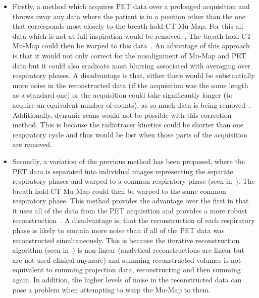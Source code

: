             \begin{itemize}
                \item Firstly, a method which acquires \gls{PET} data over a prolonged acquisition and throws away any data where the patient is in a position other than the one that corresponds most closely to the breath hold \gls{CT} \gls{Mu-Map}. For this all data which is not at full inspiration would be removed~\parencite{Liu2010, Grootjans2014}. %
                The breath hold \gls{CT} \gls{Mu-Map} could then be warped to this data~\parencite{LungMotionBreathHoldBib}. An advantage of this approach is that it would not only correct for the misalignment of \gls{Mu-Map} and \gls{PET} data but it could also eradicate most blurring associated with averaging over respiratory phases. A disadvantage is that, either there would be substantially more noise in the reconstructed data (if the acquisition was the same length as a standard one) or the acquisition could take significantly longer (to acquire an equivalent number of counts), as so much data is being removed~\parencite{Nehmeh2008a}. Additionally, dynamic scans would not be possible with this correction method. This is because the radiotracer kinetics could be shorter than one respiratory cycle and thus would be lost when those parts of the acquisition are removed.
                
                \item Secondly, a variation of the previous method has been proposed, where the \gls{PET} data is separated into individual images representing the separate respiratory phases and warped to a common respiratory phase (seen in~). The breath hold \gls{CT} \gls{Mu-Map} could then be warped to the same common respiratory phase. This method provides the advantage over the first in that it uses all of the data from the \gls{PET} acquisition and provides a more robust reconstruction~\parencite{4DPhaseMatchedReconBib}. A disadvantage is, that the reconstruction of each respiratory phase is likely to contain more noise than if all of the \gls{PET} data was reconstructed simultaneously. This is because the iterative reconstruction algorithm (seen in~) is non-linear (analytical reconstructions are linear but are not used clinical anymore) and summing reconstructed volumes is not equivalent to summing projection data, reconstructing and then summing again. %
                In addition, the higher levels of noise in the reconstructed data can pose a problem when attempting to warp the \gls{Mu-Map} to them.
                

\end{itemize}

